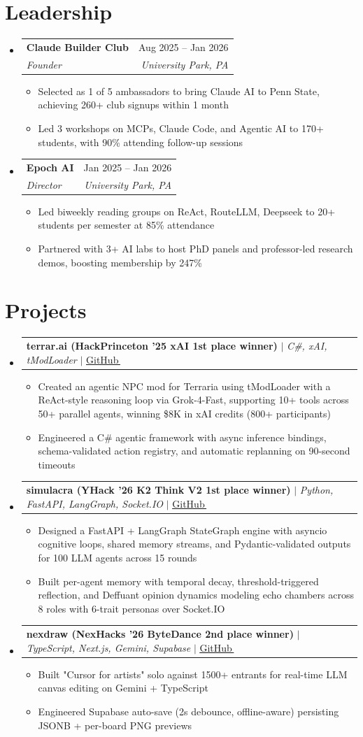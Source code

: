 \documentclass[letterpaper,11pt]{article}
\makeatletter
\newcommand{\resumeItem}[1]{
  \item\small{
    {#1 \vspace{-4pt}}
  }
}
\newcommand{\resumeSubheading}[4]{
  \vspace{-2pt}\item
    \begin{tabular*}{0.97\textwidth}[t]{l@{\extracolsep{\fill}}r}
      \textbf{#1} & #2 \\
      \textit{\small#3} & \textit{\small #4} \\
    \end{tabular*}\vspace{-7pt}
}
\newcommand{\resumeProjectHeading}[2]{
    \item
    \begin{tabular*}{0.97\textwidth}[t]{l@{\extracolsep{\fill}}r}
      \small#1 & #2 \\
    \end{tabular*}\vspace{-7pt}
}
\newcommand{\resumeSubHeadingListStart}{\begin{itemize}[leftmargin=0.15in, label={}]}
\newcommand{\resumeSubHeadingListEnd}{\end{itemize}}
\newcommand{\resumeItemListStart}{\begin{itemize}}
\newcommand{\resumeItemListEnd}{\end{itemize}\vspace{-8pt}}
\makeatother
\begin{document}
\section{\textbf{Leadership}}
  \resumeSubHeadingListStart
    \resumeSubheading
      {Claude Builder Club}{Aug 2025 -- Jan 2026}
      {Founder}{University Park, PA}
      \resumeItemListStart
              \resumeItem{Selected as 1 of 5 ambassadors to bring Claude AI to Penn State, achieving 260+ club signups within 1 month}
              \resumeItem{Led 3 workshops on MCPs, Claude Code, and Agentic AI to 170+ students, with 90\% attending follow-up sessions}
        \resumeItemListEnd
    \resumeSubheading
      {Epoch AI}{Jan 2025 -- Jan 2026}
      {Director}{University Park, PA}
      \resumeItemListStart
              \resumeItem{Led biweekly reading groups on ReAct, RouteLLM, Deepseek to 20+ students per semester at 85\% attendance}
              \resumeItem{Partnered with 3+ AI labs to host PhD panels and professor-led research demos, boosting membership by 247\%}
      \resumeItemListEnd
    \resumeSubHeadingListEnd

\section{\textbf{Projects}}
    \resumeSubHeadingListStart
    \resumeProjectHeading
  {\textbf{terrar.ai (HackPrinceton '25 xAI 1st place winner)}
  $|$
  \emph{C\#, xAI, tModLoader}
  $|$
  \href{https://github.com/SlothfulDreams/terrar.ai}{\underline{GitHub\,\faGithub}}
  }
  {}
  \resumeItemListStart
    \resumeItem{Created an agentic NPC mod for Terraria using tModLoader with a ReAct-style reasoning loop via Grok-4-Fast, supporting 10+ tools across 50+ parallel agents, winning \$8K in xAI credits (800+ participants)}
    \resumeItem{Engineered a C\# agentic framework with async inference bindings, schema-validated action registry, and automatic replanning on 90-second timeouts}
  \resumeItemListEnd
     \resumeProjectHeading
  {\textbf{simulacra (YHack '26 K2 Think V2 1st place winner)}
  $|$
  \emph{Python, FastAPI, LangGraph, Socket.IO}
  $|$
  \href{https://github.com/AdamPSU/simulacra}{\underline{GitHub\,\faGithub}}
  }{}
  \resumeItemListStart
    \resumeItem{Designed a FastAPI + LangGraph StateGraph engine with asyncio cognitive loops, shared memory streams, and Pydantic-validated outputs for 100 LLM agents across 15 rounds}
    \resumeItem{Built per-agent memory with temporal decay, threshold-triggered reflection, and Deffuant opinion dynamics modeling echo chambers across 8 roles with 6-trait personas over Socket.IO}
  \resumeItemListEnd
    \resumeProjectHeading
  {\textbf{nexdraw (NexHacks '26 ByteDance 2nd place winner)}
  $|$
  \emph{TypeScript, Next.js, Gemini, Supabase}
  $|$
  \href{https://github.com/AdamPSU/maestro}{\underline{GitHub\,\faGithub}}
  }
  {}
  \resumeItemListStart
    \resumeItem{
    Built "Cursor for artists" solo against 1500+ entrants for real-time LLM canvas editing on Gemini + TypeScript
    }
    \resumeItem{
    Engineered Supabase auto-save (2s debounce, offline-aware) persisting JSONB + per-board PNG previews
    }
  \resumeItemListEnd
    \resumeSubHeadingListEnd
\end{document}
